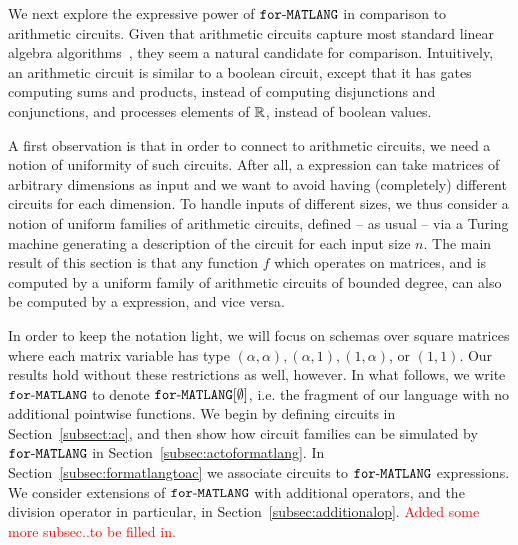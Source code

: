 We next explore the expressive power of $\texttt{for}\text{-}\texttt{MATLANG}$ in comparison to arithmetic circuits.
Given that arithmetic circuits capture most standard linear algebra algorithms~\cite{Raz02,ShpilkaY10},
they seem a natural candidate for comparison. 
%
Intuitively, an arithmetic circuit is similar to a boolean circuit,
except that it has gates computing sums and products, 
instead of computing disjunctions and conjunctions, and processes elements of $\mathbb{R}$, 
instead of boolean values. 


A first observation is that in order to connect \langfor to arithmetic circuits, we need a 
notion of uniformity of such circuits. After all, a \langfor expression can take matrices 
of arbitrary dimensions as input and we want to avoid having (completely) different circuits
for each dimension.
%
To handle inputs of different sizes, we thus consider a notion of uniform families of arithmetic
circuits, defined -- as usual -- via a Turing machine generating a description of the circuit for 
each input size $n$.
%
The main result of this section is that any function $f$ which operates on matrices, and is computed 
by a uniform family of arithmetic circuits of bounded degree, can also be computed by 
a \langfor expression, and vice versa.

In order to keep the notation light, we will focus on \langfor schemas over square matrices where 
each matrix variable has type $(\alpha,\alpha),(\alpha,1),(1,\alpha)$, or $(1,1)$.
Our results hold without these restrictions as well, however. 
%
In what follows, we write $\texttt{for}\text{-}\texttt{MATLANG}$ to denote $\texttt{for}\text{-}\texttt{MATLANG}[\emptyset]$, i.e. the fragment of 
our language with no additional pointwise functions. 
%
We begin by defining circuits in Section~\ref{subsect:ac}, and then show how circuit families can be
simulated by $\texttt{for}\text{-}\texttt{MATLANG}$ in Section~\ref{subsec:actoformatlang}. In Section~\ref{subsec:formatlangtoac} 
we associate circuits to $\texttt{for}\text{-}\texttt{MATLANG}$ expressions. We consider extensions of $\texttt{for}\text{-}\texttt{MATLANG}$ with additional
operators, and the division operator in particular, in Section~\ref{subsec:additionalop}.
\textcolor{red}{Added some more subsec..to be filled in.}

